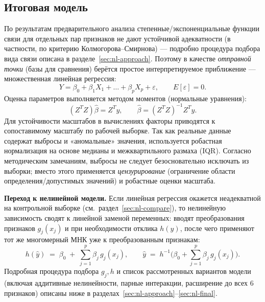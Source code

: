 \documentclass[a4paper, 14pt]{extarticle}
\begin{document}
\subsection{Итоговая модель}
По результатам предварительного анализа степенные/экспоненциальные функции связи для отдельных пар признаков не дают
устойчивой адекватности (в частности, по критерию Колмогорова--Смирнова) --- подробно процедура подбора
вида связи описана в разделе~\ref{sec:nl-approach}. Поэтому в качестве \textit{отправной точки} (базы для сравнения)
берётся простое интерпретируемое приближение --- множественная линейная регрессия:
\[
Y = \beta_0 + \beta_1 X_1 + \dots + \beta_p X_p + \varepsilon,\qquad E[\varepsilon]=0.
\]
Оценка параметров выполняется методом моментов (нормальные уравнения):
\[
(Z^T Z)\hat{\beta}=Z^T y,\qquad \hat{\beta}=(Z^T Z)^{-1}Z^T y.
\]
Для устойчивости масштабов в вычислениях факторы приводятся к сопоставимому масштабу по рабочей
выборке. Так как реальные данные содержат выбросы и «аномальные» значения, используется робастная
нормализация на основе медианы и межквартильного размаха (IQR). Согласно методическим замечаниям,
выбросы не следует безосновательно исключать из выборки; вместо этого применяется \textit{цензурирование}
(ограничение области определения/допустимых значений) и робастные оценки масштаба.

\medskip
\textbf{Переход к нелинейной модели.} Если линейная регрессия окажется неадекватной на контрольной выборке
(см.~раздел~\ref{sec:nl-compare}), то нелинейную зависимость сводят к линейной заменой переменных:
вводят преобразования признаков $g_j(x_j)$ и при необходимости отклика $h(y)$, после чего применяют тот же
многомерный МНК уже к преобразованным признакам:
\[
h(\hat y)\;=\;\beta_0\;+\;\sum_{j=1}^{p}\beta_j\, g_j(x_j),\qquad
\hat y\;=\;h^{-1}\!\bigg(\beta_0+\sum_{j=1}^{p}\beta_j\, g_j(x_j)\bigg).
\]
Подробная процедура подбора $g_j,h$ и список рассмотренных вариантов модели (включая аддитивные нелинейности,
парные интеракции, расширение до всех 6 признаков) описаны ниже в разделах~\ref{sec:nl-approach}--\ref{sec:nl-final}.
\end{document}
